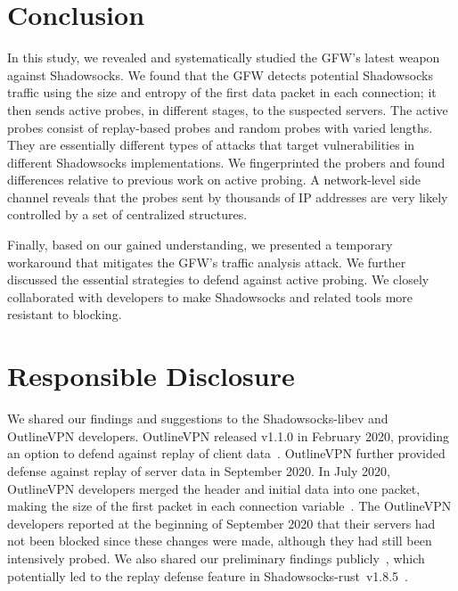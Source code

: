 \documentclass[sigconf,letterpaper]{acmart}
\begin{document}
\section{Conclusion}
\label{sec:conclusions}

In this study, we revealed and systematically studied the GFW's latest weapon against Shadowsocks.
We found that the GFW detects potential Shadowsocks traffic using the size and entropy of the first data packet in each connection;
it then sends active probes, in different stages,
to the suspected servers.
The active probes consist of replay-based probes and random probes with varied lengths.
They are essentially different types of attacks that target vulnerabilities in different Shadowsocks implementations.
We fingerprinted the probers and found differences relative to previous work on active probing.
A network-level side channel reveals that the probes sent by thousands of IP addresses are very likely controlled by a set of centralized structures.

Finally, based on our gained understanding,
we presented a temporary workaround that mitigates the GFW's traffic analysis attack.
We further discussed the essential strategies to defend against active probing.
We closely collaborated with developers to make Shadowsocks and related tools more resistant to blocking.

\section*{Responsible Disclosure}
\label{sec:responsible-disclosure}


We shared our findings and suggestions to the Shadowsocks-libev and OutlineVPN developers.
OutlineVPN released v1.1.0 in February 2020,
providing an option to defend against replay of client data~\cite{outline-v1.1.0}.
OutlineVPN further provided defense against replay of server data in September 2020.
In July 2020,
OutlineVPN developers merged the header and initial data into one packet,
making the size of the first packet in each connection variable~\cite{outline-changes}.
The OutlineVPN developers reported at the beginning of September 2020 that
their servers had not been blocked since these changes were made,
although they had still been intensively probed.
We also shared our preliminary findings publicly~\cite{Anonymous2020ShadowsocksReport},
which potentially led to the replay defense feature in Shadowsocks-rust~v1.8.5~\cite{shadowsocks-rust-v1.8.5}.
\end{document}
